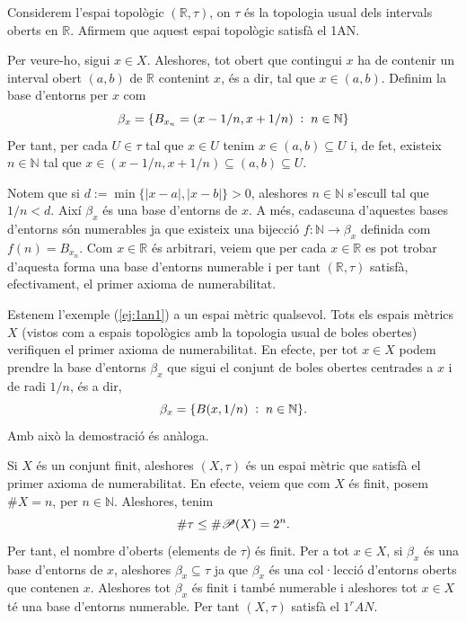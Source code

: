 \documentclass[../main.tex]{subfiles}
\begin{document}
\begin{ej}
\label{ej:1an1} Considerem l'espai topològic $(\mathbb{R},\tau)$, on $\tau$ és la topologia usual dels intervals oberts en $\mathbb{R}$. Afirmem que aquest espai topològic satisfà el 1AN.

Per veure-ho, sigui $x\in X$. Aleshores, tot obert que contingui $x$ ha de contenir un interval obert $(a,b)$ de $\mathbb{R}$ contenint $x$, és a dir, tal que $x\in (a,b)$. Definim la base d'entorns per $x$ com
\begin{equation}
    \notag
    \beta_x = \{B_{x_n} = (x-1/n, x+1/n)\;:\;n\in\mathbb{N}\}
\end{equation}
Per tant, per cada $U\in\tau$ tal que $x\in U$ tenim $x\in (a,b)\subseteq U$ i, de fet, existeix $n\in\mathbb{N}$ tal que $x\in (x-1/n,x+1/n)\subseteq (a,b)\subseteq U$.

Notem que si $d:=\min\{|x-a|,|x-b|\}>0$, aleshores $n\in\mathbb{N}$ s'escull tal que $1/n<d$. Així $\beta_x$ és una base d'entorns de $x$. A més, cadascuna d'aquestes bases d'entorns són numerables ja que existeix una bijecció $f:\mathbb{N}\rightarrow \beta_x$ definida com $f(n) = B_{x_n}$. Com $x\in\mathbb{R}$ és arbitrari, veiem que per cada $x\in\mathbb{R}$ es pot trobar d'aquesta forma una base d'entorns numerable i per tant $(\mathbb{R},\tau)$ satisfà, efectivament, el primer axioma de numerabilitat.
\end{ej}

\begin{ej}
\label{ej:1an2} Estenem l'exemple (\ref{ej:1an1}) a un espai mètric qualsevol. Tots els espais mètrics $X$ (vistos com a espais topològics amb la topologia usual de boles obertes) verifiquen el primer axioma de numerabilitat. En efecte, per tot $x\in X$ podem prendre la base d'entorns $\beta_x$ que sigui el conjunt de boles obertes centrades a $x$ i de radi $1/n$, és a dir,
\begin{equation}
    \notag
    \beta_x = \{B(x,1/n)\;:\;n\in\mathbb{N}\} .
\end{equation}
Amb això la demostració és anàloga.
\end{ej}

\begin{ej}
\label{ej:1an3} Si $X$ és un conjunt finit, aleshores $(X,\tau)$ és un espai mètric que satisfà el primer axioma de numerabilitat. En efecte, veiem que com $X$ és finit, posem $\#X=n$, per $n\in\mathbb{N}$. Aleshores, tenim
\begin{equation}
    \notag
    \#\tau \leq \#\mathscr{P}(X) = 2^n.
\end{equation}
Per tant, el nombre d'oberts (elements de $\tau$) és finit. Per a tot $x\in X$, si $\beta_x$ és una base d'entorns de $x$, aleshores $\beta_x\subseteq \tau$ ja que $\beta_x$ és una col·lecció d'entorns oberts que contenen $x$. Aleshores tot $\beta_x$ és finit i també numerable i aleshores tot $x\in X$ té una base d'entorns numerable. Per tant $(X,\tau)$ satisfà el $1^rAN$.
\end{ej}
\end{document}
